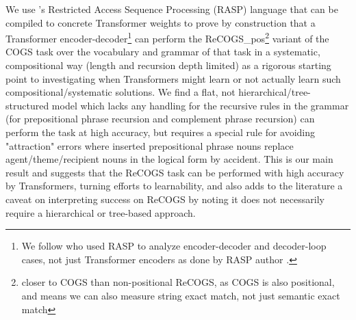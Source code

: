 \documentclass[11pt]{article}
\begin{document}
We use \cite{Weiss2021}'s Restricted Access Sequence Processing (RASP) language that can be compiled to concrete Transformer weights to prove by construction that a Transformer encoder-decoder\footnote{We follow \cite{Zhou2024} who used RASP to analyze encoder-decoder and decoder-loop cases, not just Transformer encoders as done by RASP author \cite{Weiss2021}.} can perform the ReCOGS\_pos\footnote{closer to COGS than non-positional ReCOGS, as COGS is also positional, and means we can also measure string exact match, not just semantic exact match} \cite{Wu2023} variant of the COGS \cite{KimLinzen2020} task over the vocabulary and grammar of that task in a systematic, compositional way (length and recursion depth limited) as a rigorous starting point to investigating when Transformers might learn or not actually learn such compositional/systematic solutions. We find a flat, not hierarchical/tree-structured model which lacks any handling for the recursive rules in the grammar (for prepositional phrase recursion and complement phrase recursion) can perform the task at high accuracy, but requires a special rule for avoiding "attraction" errors where inserted prepositional phrase nouns replace agent/theme/recipient nouns in the logical form by accident. This is our main result and suggests that the ReCOGS task can be performed with high accuracy by Transformers, turning efforts to learnability, and also adds to the literature a caveat on interpreting success on ReCOGS by noting it does not necessarily require a hierarchical or tree-based approach. 

\end{document}
